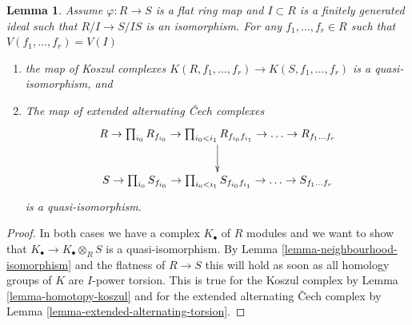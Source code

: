 \documentclass[10pt,a4paper]{amsart}
\theoremstyle{plain}
\newtheorem{lemma}[subsection]{Lemma}
\theoremstyle{definition}
\theoremstyle{remark}
\numberwithin{equation}{subsection}
\begin{document}
\begin{lemma}
\label{lemma-map-identifies-koszul-and-cech-complexes}
Assume $\varphi : R \to S$ is a flat ring map and $I \subset R$ is a
finitely generated ideal such that $R/I \to S/IS$ is an isomorphism.
For any $f_1, \ldots, f_r \in R$ such that $V(f_1, \ldots, f_r) = V(I)$
\begin{enumerate}
\item the map of Koszul complexes
$K(R, f_1, \ldots, f_r) \to K(S, f_1, \ldots, f_r)$ is a quasi-isomorphism, and
\item The map of extended alternating {\v C}ech complexes
$$
\xymatrix{
R \to \prod_{i_0} R_{f_{i_0}} \to \prod_{i_0 < i_1} R_{f_{i_0}f_{i_1}}
\to \ldots \to R_{f_1\ldots f_r} \ar[d] \\
S \to \prod_{i_0} S_{f_{i_0}} \to \prod_{i_0 < i_1} S_{f_{i_0}f_{i_1}}
\to \ldots \to S_{f_1\ldots f_r}
}
$$
is a quasi-isomorphism.
\end{enumerate}
\end{lemma}

\begin{proof}
In both cases we have a complex $K_\bullet$ of $R$ modules and we want
to show that $K_\bullet \to K_\bullet \otimes_R S$ is a quasi-isomorphism.
By Lemma \ref{lemma-neighbourhood-isomorphism} and the flatness of
$R \to S$ this will hold as soon as all homology groups of $K$ are $I$-power
torsion. This is true for the Koszul complex by
Lemma \ref{lemma-homotopy-koszul} and for the extended alternating {\v C}ech
complex by Lemma \ref{lemma-extended-alternating-torsion}.
\end{proof}
\end{document}
